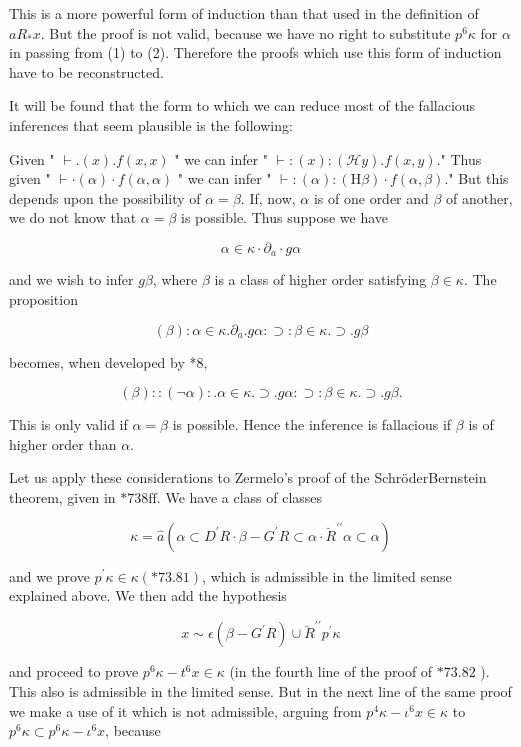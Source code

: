 \documentclass[10pt]{article}
\begin{document}
This is a more powerful form of induction than that used in the definition of $a R_{*} x$. But the proof is not valid, because we have no right to substitute $p^{6} \kappa$ for $\alpha$ in passing from (1) to (2). Therefore the proofs which use this form of induction have to be reconstructed.

It will be found that the form to which we can reduce most of the fallacious inferences that seem plausible is the following:

Given " $\vdash .(x) . f(x, x)$ " we can infer " $\vdash:(x):(\mathcal{H} y) . f(x, y)$." Thus given " $\vdash \cdot(\alpha) \cdot f(\alpha, \alpha)$ " we can infer " $\vdash:(\alpha):(\mathrm{H} \beta) \cdot f(\alpha, \beta)$." But this depends upon the possibility of $\alpha=\beta$. If, now, $\alpha$ is of one order and $\beta$ of another, we do not know that $\alpha=\beta$ is possible. Thus suppose we have

$$
\alpha \in \kappa \cdot \partial_{a} \cdot g \alpha
$$

and we wish to infer $g \beta$, where $\beta$ is a class of higher order satisfying $\beta \in \kappa$. The proposition

$$
(\beta): \alpha \in \kappa . \partial_{a} . g \alpha: \supset: \beta \in \kappa . \supset . g \beta
$$

becomes, when developed by *8,

$$
(\beta)::(\neg \alpha): . \alpha \in \kappa . \supset . g \alpha: \supset: \beta \in \kappa . \supset . g \beta .
$$

This is only valid if $\alpha=\beta$ is possible. Hence the inference is fallacious if $\beta$ is of higher order than $\alpha$.

Let us apply these considerations to Zermelo's proof of the SchröderBernstein theorem, given in $* 738 \mathrm{ff}$. We have a class of classes

$$
\kappa=\hat{a}\left(\alpha \subset D^{\prime} R \cdot \beta-G^{\prime} R \subset \alpha \cdot \breve{R}^{\prime \prime} \alpha \subset \alpha\right)
$$

and we prove $p^{\prime} \kappa \in \kappa(* 73.81)$, which is admissible in the limited sense explained above. We then add the hypothesis

$$
x \sim \epsilon\left(\beta-G^{\prime} R\right) \cup \breve{R}^{\prime \prime} p^{\prime} \kappa
$$

and proceed to prove $p^{6} \kappa-t^{6} x \in \kappa$ (in the fourth line of the proof of $* 73.82$ ). This also is admissible in the limited sense. But in the next line of the same proof we make a use of it which is not admissible, arguing from $p^{4} \kappa-\iota^{6} x \in \kappa$ to $p^{6} \kappa \subset p^{6} \kappa-\iota^{6} x$, because
\end{document}
